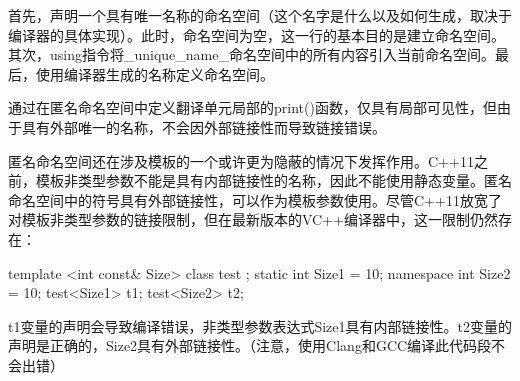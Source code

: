首先，声明一个具有唯一名称的命名空间（这个名字是什么以及如何生成，取决于编译器的具体实现）。此时，命名空间为空，这一行的基本目的是建立命名空间。其次，using指令将\_unique\_name\_命名空间中的所有内容引入当前命名空间。最后，使用编译器生成的名称定义命名空间。

通过在匿名命名空间中定义翻译单元局部的print()函数，仅具有局部可见性，但由于具有外部唯一的名称，不会因外部链接性而导致链接错误。

匿名命名空间还在涉及模板的一个或许更为隐蔽的情况下发挥作用。C++11之前，模板非类型参数不能是具有内部链接性的名称，因此不能使用静态变量。匿名命名空间中的符号具有外部链接性，可以作为模板参数使用。尽管C++11放宽了对模板非类型参数的链接限制，但在最新版本的VC++编译器中，这一限制仍然存在：

\begin{cpp}
template <int const& Size>
class test {};
static int Size1 = 10;
namespace
{
    int Size2 = 10;
}
test<Size1> t1;
test<Size2> t2;
\end{cpp}

t1变量的声明会导致编译错误，非类型参数表达式Size1具有内部链接性。t2变量的声明是正确的，Size2具有外部链接性。（注意，使用Clang和GCC编译此代码段不会出错）











